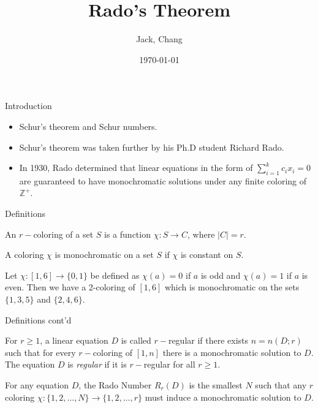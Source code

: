 \documentclass{beamer}
\title{Rado's Theorem}
\date{\today}
\author{Jack, Chang}
\newcommand{\Z}{\mathbb Z} %
\begin{document}
\begin{frame}[plain]
    \maketitle
\end{frame}

\begin{frame}{Introduction}
    \begin{itemize}
        \item Schur's theorem and Schur numbers. 
        \pause
        \item Schur's theorem was taken further by his Ph.D student Richard Rado.
        \pause
        \item In 1930, Rado determined that linear equations in the form of $\sum^k_{i=1}c_ix_i=0$ are guaranteed to have monochromatic solutions under any finite coloring of $\Z^+$.
    \end{itemize}
\end{frame}


\begin{frame}{Definitions}
    \begin{definition}[Coloring]
        An $r-$coloring of a set $S$ is a function $\chi : S \to C$, where $|C| = r$.
    \end{definition}
    \pause
    \begin{definition}[Monochromatic]
        A coloring $\chi$ is monochromatic on a set $S$ if $\chi$ is constant on $S$.
    \end{definition}
    
    \pause
    \begin{example}
    	Let $\chi : [1,6] \to \{0,1\}$ be defined as $\chi(a)=0$ if $a$ is odd and $\chi(a)=1$ if $a$ is even. Then we have a 2-coloring of $[1,6]$ which is monochromatic on the sets $\{1,3,5\}$ and  $\{2,4,6\}$.
    \end{example}
    
\end{frame}

\begin{frame}{Definitions cont'd}
    \begin{definition}[Regularity]
        For $r\geq 1$, a linear equation $D$ is called $r-$regular if there exists $n=n(D;r)$ such that for every $r-$coloring of $[1,n]$ there is a monochromatic solution to $D$. The equation $D$ is \textit{regular} if it is $r-$regular for all $r \geq 1$.
    \end{definition}
    \pause
    \begin{definition}[Rado Number]
        For any equation $D$, the Rado Number $R_r(D)$ is the smallest $N$ such that any $r$ coloring $\chi : \{1,2,\dots,N\} \to \{1,2,\dots, r\}$ must induce a monochromatic solution to $D$. 
    \end{definition}
\end{frame}
\end{document}
